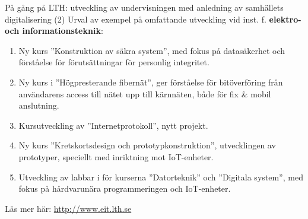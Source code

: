 \documentclass[aspectratio=169]{beamer}
\newenvironment{Slide}[1]%
  {\begin{frame}[environment=Slide]{#1}}
  {\end{frame}}%
\begin{document}
\begin{Slide}{På gång på LTH: utveckling av undervisningen med anledning av samhällets digitalisering (2)}
  Urval av exempel på omfattande utveckling vid inst. f. \textbf{elektro- och informationsteknik}: 
  \begin{enumerate}
    \item Ny kurs ''Konstruktion av säkra system'', med fokus på datasäkerhet och förståelse för förutsättningar för personlig integritet.
    \item Ny kurs i ''Högpresterande fibernät'', ger förståelse för bitöverföring från användarens access till nätet upp till kärnnäten, både för fix \& mobil anslutning.
    \item Kursutveckling av ''Internetprotokoll'', nytt projekt.
    \item Ny kurs ''Kretskortsdesign och prototypkonstruktion'', utvecklingen av prototyper, speciellt med inriktning mot IoT-enheter.
    \item Utveckling av labbar i för kurserna ''Datorteknik''  och ''Digitala system'', med fokus på hårdvarunära programmeringen och IoT-enheter. 
  \end{enumerate}
  Läs mer här: \url{http://www.eit.lth.se}
\end{Slide}
\end{document}
